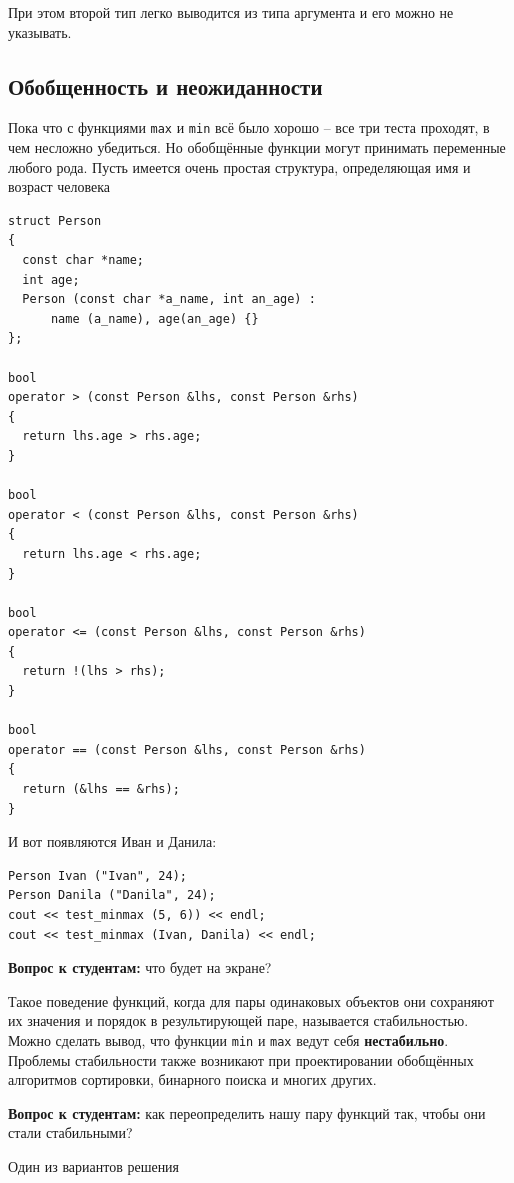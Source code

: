 \documentclass[a4paper,12pt,oneside]{book}
\newif\ifanswers
\begin{document}
При этом второй тип легко выводится из типа аргумента и его можно не указывать.

\subsection{Обобщенность и неожиданности}\label{GenericCode}

Пока что с функциями \lstinline!max! и \lstinline!min! всё было хорошо -- все три теста проходят, в чем несложно убедиться. Но обобщённые функции могут принимать переменные любого рода. Пусть имеется очень простая структура, определяющая имя и возраст человека

\begin{lstlisting}
struct Person
{
  const char *name;
  int age;
  Person (const char *a_name, int an_age) : 
      name (a_name), age(an_age) {}
};

bool
operator > (const Person &lhs, const Person &rhs)
{
  return lhs.age > rhs.age;
}

bool
operator < (const Person &lhs, const Person &rhs)
{
  return lhs.age < rhs.age;
}

bool
operator <= (const Person &lhs, const Person &rhs)
{
  return !(lhs > rhs);
}

bool
operator == (const Person &lhs, const Person &rhs)
{
  return (&lhs == &rhs);
}
\end{lstlisting}

И вот появляются Иван и Данила:

\begin{lstlisting}
Person Ivan ("Ivan", 24);
Person Danila ("Danila", 24);
cout << test_minmax (5, 6)) << endl;
cout << test_minmax (Ivan, Danila) << endl;
\end{lstlisting}

\textbf{Вопрос к студентам:} что будет на экране?

\ifanswers
Правильный ответ: неожиданно на экране будет 1 и 0. 
\fi

Такое поведение функций, когда для пары одинаковых объектов они сохраняют их значения и порядок в результирующей паре, называется стабильностью. Можно сделать вывод, что функции \lstinline!min! и \lstinline!max! ведут себя \textbf{нестабильно}. Проблемы стабильности также возникают при проектировании обобщённых алгоритмов сортировки, бинарного поиска и многих других.

\textbf{Вопрос к студентам:} как переопределить нашу пару функций так, чтобы они стали стабильными?

\ifanswers
Один из вариантов решения
\end{document}

